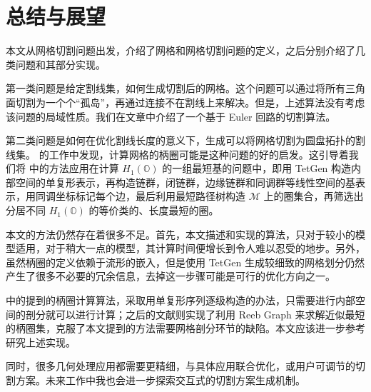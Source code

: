 
\chapter{总结与展望}

本文从网格切割问题出发，介绍了网格和网格切割问题的定义，之后分别介绍了几类问题和其部分实现。

第一类问题是给定割线集，如何生成切割后的网格。这个问题可以通过将所有三角面切割为一个个“孤岛”，再通过连接不在割线上来解决。但是，上述算法没有考虑该问题的局域性质。我们在文章中介绍了一个基于 Euler 回路的切割算法。

第二类问题是如何在优化割线长度的意义下，生成可以将网格切割为圆盘拓扑的割线集。\citet{Chai2018} 的工作中发现，计算网格的柄圈可能是这种问题的好的启发。这引导着我们将 \citet{Busaryev2012} 中的方法应用在计算 $ H_1(\mathbb{O}) $ 的一组最短基的问题中，即用 TetGen 构造内部空间的单复形表示，再构造链群，闭链群，边缘链群和同调群等线性空间的基表示，用同调坐标标记每个边，最后利用最短路径树构造 $ \mathcal{M} $ 上的圈集合，再筛选出分居不同 $ H_1(\mathbb{O}) $ 的等价类的、长度最短的圈。

本文的方法仍然存在着很多不足。首先，本文描述和实现的算法，只对于较小的模型适用，对于稍大一点的模型，其计算时间便增长到令人难以忍受的地步。另外，虽然柄圈的定义依赖于流形的嵌入，但是使用 TetGen 生成较细致的网格划分仍然产生了很多不必要的冗余信息，去掉这一步骤可能是可行的优化方向之一。

\citet{Dey2008} 中的提到的柄圈计算算法，采取用单复形序列逐级构造的办法，只需要进行内部空间的剖分就可以进行计算；之后的文献\cite{Dey2013}则实现了利用 Reeb Graph 来求解近似最短的柄圈集，克服了本文提到的方法需要网格剖分环节的缺陷。本文应该进一步参考研究上述实现。

同时，很多几何处理应用都需要更精细，与具体应用联合优化，或用户可调节的切割方案。未来工作中我也会进一步探索交互式的切割方案生成机制。